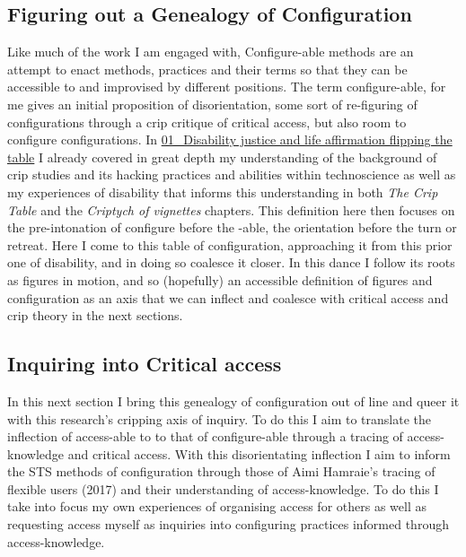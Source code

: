 \hypertarget{figuring-out-a-genealogy-of-configuration-1}{%
\subsection{Figuring out a Genealogy of
Configuration}\label{figuring-out-a-genealogy-of-configuration-1}}

Like much of the work I am engaged with, Configure-able methods are an
attempt to enact methods, practices and their terms so that they can be
accessible to and improvised by different positions. The term
configure-able, for me gives an initial proposition of disorientation,
some sort of re-figuring of configurations through a crip critique of
critical access, but also room to configure configurations. In
\href{../../01_Disability_justice_and_life_affirmation_flipping_the_table/01_Disability\%20justice\%20and\%20life\%20affirmation\%20flipping\%20the\%20table.md}{01\_Disability
justice and life affirmation flipping the table} I already covered in
great depth my understanding of the background of crip studies and its
hacking practices and abilities within technoscience as well as my
experiences of disability that informs this understanding in both
\emph{The Crip Table} and the \emph{Criptych of vignettes} chapters.
This definition here then focuses on the pre-intonation of configure
before the -able, the orientation before the turn or retreat. Here I
come to this table of configuration, approaching it from this prior one
of disability, and in doing so coalesce it closer. In this dance I
follow its roots as figures in motion, and so (hopefully) an accessible
definition of figures and configuration as an axis that we can inflect
and coalesce with critical access and crip theory in the next sections.

\hypertarget{inquiring-into-critical-access}{%
\subsection{Inquiring into Critical
access}\label{inquiring-into-critical-access}}

In this next section I bring this genealogy of configuration out of line
and queer it with this research's cripping axis of inquiry. To do this I
aim to translate the inflection of access-able to to that of
configure-able through a tracing of access-knowledge and critical
access. With this disorientating inflection I aim to inform the STS
methods of configuration through those of Aimi Hamraie's tracing of
flexible users (2017) and their understanding of access-knowledge. To do
this I take into focus my own experiences of organising access for
others as well as requesting access myself as inquiries into configuring
practices informed through access-knowledge.

